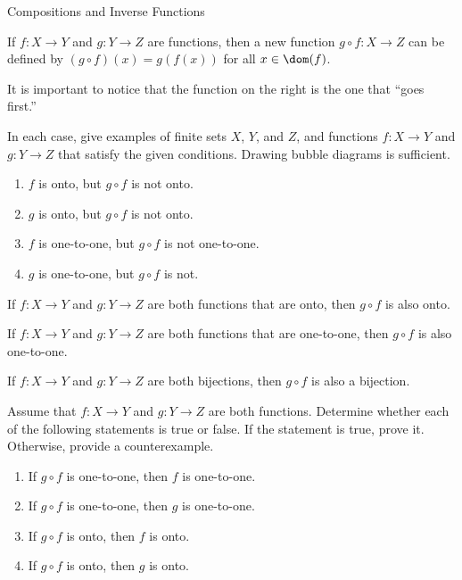 \begin{section}{Compositions and Inverse Functions}

\begin{definition}
If $f:X\to Y$ and $g:Y\to Z$ are functions, then a new function $g\circ f:X\to Z$ can be defined by $(g\circ f)(x)=g(f(x))$ for all $x\in\dom(f)$.
\end{definition}

It is important to notice that the function on the right is the one that ``goes first.''

\begin{problem}
In each case, give examples of finite sets $X$, $Y$, and $Z$, and functions $f:X\to Y$ and $g:Y\to Z$ that satisfy the given conditions.  Drawing bubble diagrams is sufficient.
\begin{enumerate}[label=\textrm{(\alph*)}]
\item $f$ is onto, but $g\circ f$ is not onto.
\item $g$ is onto, but $g\circ f$ is not onto.
\item $f$ is one-to-one, but $g\circ f$ is not one-to-one.
\item $g$ is one-to-one, but $g\circ f$ is not.
\end{enumerate}
\end{problem}

\begin{theorem}
If $f:X\to Y$ and $g:Y\to Z$ are both functions that are onto, then $g\circ f$ is also onto.
\end{theorem}

\begin{theorem}
If $f:X\to Y$ and $g:Y\to Z$ are both functions that are one-to-one, then $g\circ f$ is also one-to-one.
\end{theorem}

\begin{corollary}
If $f:X\to Y$ and $g:Y\to Z$ are both bijections, then $g\circ f$ is also a bijection.
\end{corollary}

\begin{problem}
Assume that $f:X\to Y$ and $g:Y\to Z$ are both functions.  Determine whether each of the following statements is true or false. If the statement is true, prove it.  Otherwise, provide a counterexample.
\begin{enumerate}[label=\textrm{(\alph*)}]
\item If $g\circ f$ is one-to-one, then $f$ is one-to-one.
\item If $g\circ f$ is one-to-one, then $g$ is one-to-one.
\item If $g\circ f$ is onto, then $f$ is onto.
\item If $g\circ f$ is onto, then $g$ is onto.
\end{enumerate}
\end{problem}


\end{section}
